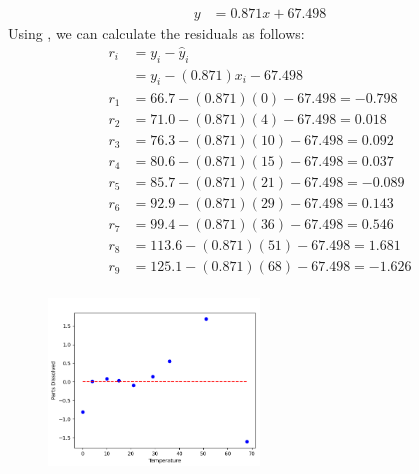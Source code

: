 \documentclass{uofa-eng-assignment}
\begin{document}
\begin{enumerate}
\begin{align*}
            y & = 0.871x + 67.498
        \end{align*}
        Using , we can calculate the residuals as follows:
        \begin{align*}
            r_i & = y_i - \hat{y}_i                       \\
                & = y_i - (0.871)x_i - 67.498             \\
            r_1 & = 66.7 - (0.871)(0) - 67.498 = -0.798   \\
            r_2 & = 71.0 - (0.871)(4) - 67.498 = 0.018    \\
            r_3 & = 76.3 - (0.871)(10) - 67.498 = 0.092   \\
            r_4 & = 80.6 - (0.871)(15) - 67.498 = 0.037   \\
            r_5 & = 85.7 - (0.871)(21) - 67.498 = -0.089  \\
            r_6 & = 92.9 - (0.871)(29) - 67.498 = 0.143   \\
            r_7 & = 99.4 - (0.871)(36) - 67.498 = 0.546   \\
            r_8 & = 113.6 - (0.871)(51) - 67.498 = 1.681  \\
            r_9 & = 125.1 - (0.871)(68) - 67.498 = -1.626 \\
        \end{align*}
        \begin{figure}[h]
            \centering
            \includegraphics[width=0.5\textwidth]{11.2.3.png}
        \end{figure}

\end{enumerate}
\end{document}
